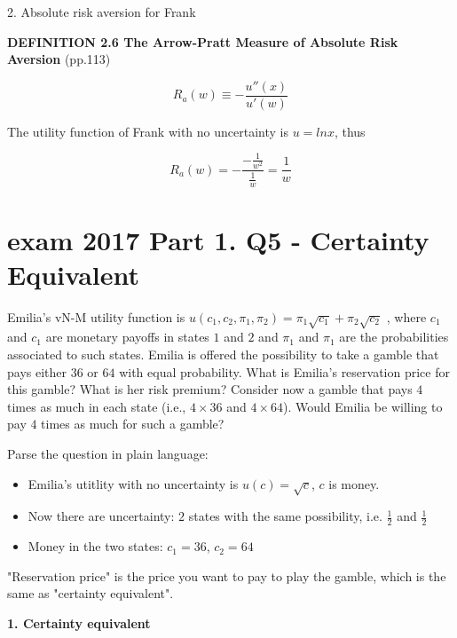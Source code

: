 \documentclass{article}
\begin{document}
2. Absolute risk aversion for Frank

\begin{mdframed}[backgroundcolor=blue!20,linecolor=white]
\textbf{DEFINITION 2.6 The Arrow-Pratt Measure of Absolute Risk Aversion} (pp.113)

$$R_a(w) \equiv -\frac{u''(x)}{u'(w)}$$

\end{mdframed}


The utility function of Frank with no uncertainty is $u = ln x$, thus

$$R_a(w) = -\frac{-\frac{1}{w^2}}{\frac{1}{w}}=\frac{1}{w}$$

\newpage 

\section{exam 2017 Part 1. Q5 - Certainty Equivalent}

Emilia's vN-M utility function is $u(c_1,c_2,\pi_1, \pi_2) = \pi_1 \sqrt{c_1} + \pi_2 \sqrt{c_2}$
, where $c_1$ and $c_1$ are
monetary payoffs in states $1$ and $2$ and $\pi_1$ and $\pi_1$ are the probabilities associated to such states.
Emilia is offered the possibility to take a gamble that pays either $36$ or $64$ with equal probability.
What is Emilia’s reservation price for this gamble? What is her risk premium?
Consider now a gamble that pays $4$ times as much in each state (i.e., $4 \times 36$ and $4 \times 64$). Would
Emilia be willing to pay $4$ times as much for such a gamble? 


\begin{mdframed}[backgroundcolor=blue!20,linecolor=white]
Parse the question in plain language:

\begin{itemize}
\item Emilia's utitlity with no uncertainty is $u(c) = \sqrt{c}$, $c$ is money.
\item Now there are uncertainty: $2$ states with the same possibility, i.e. $\frac{1}{2}$ and $\frac{1}{2}$
\item Money in the two states: $c_1 = 36$, $c_2 = 64$

\end{itemize}

"Reservation price" is the price you want to pay to play the gamble, which is the same as "certainty equivalent".
\end{mdframed}

\textbf{1. Certainty equivalent}
\end{document}
